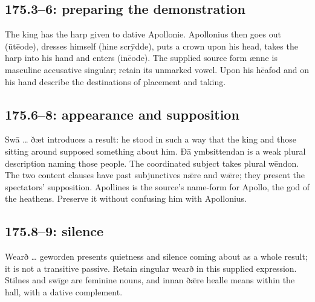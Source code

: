 \subsection*{175.3–6: preparing the demonstration}

The king has the harp given to dative Apollonie. Apollonius then goes out (ūtēode), dresses himself (hine scrȳdde), puts a crown upon his head, takes the harp into his hand and enters (inēode). The supplied source form ænne is masculine accusative singular; retain its unmarked vowel. Upon his hēafod and on his hand describe the destinations of placement and taking.

\subsection*{175.6–8: appearance and supposition}

Swā … ðæt introduces a result: he stood in such a way that the king and those sitting around supposed something about him. Ðā ymbsittendan is a weak plural description naming those people. The coordinated subject takes plural wēndon. The two content clauses have past subjunctives nǣre and wǣre; they present the spectators’ supposition. Apollines is the source’s name-form for Apollo, the god of the heathens. Preserve it without confusing him with Apollonius.

\subsection*{175.8–9: silence}

Wearð … geworden presents quietness and silence coming about as a whole result; it is not a transitive passive. Retain singular wearð in this supplied expression. Stilnes and swīge are feminine nouns, and innan ðǣre healle means within the hall, with a dative complement.

